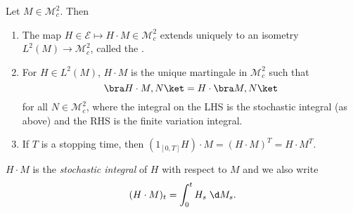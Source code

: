 \documentclass[a4paper]{article}
\begin{document}
\begin{thm}
  Let $M \in \mathcal{M}_c^2$. Then
  \begin{enumerate}
    \item The map $H \in \mathcal{E} \mapsto H \cdot M \in \mathcal{M}_c^2$ extends uniquely to an isometry $L^2(M) \to \mathcal{M}^2_c$, called the .
    \item For $H \in L^2(M)$, $H \cdot M$ is the unique martingale in $\mathcal{M}_c^2$ such that
      \[
        \bra H \cdot M, N\ket = H \cdot \bra M, N\ket
      \]
      for all $N \in \mathcal{M}_c^2$, where the integral on the LHS is the stochastic integral (as above) and the RHS is the finite variation integral.
    \item If $T$ is a stopping time, then $(1_{[0, T]} H) \cdot M = (H \cdot M)^T = H \cdot M^T$.
  \end{enumerate}
\end{thm}

\begin{defi}
  $H \cdot M$ is the \emph{stochastic integral} of $H$ with respect to $M$ and we also write
  \[
    (H \cdot M)_t = \int_0^t H_s \;\d M_s.
  \]
\end{defi}
\end{document}
